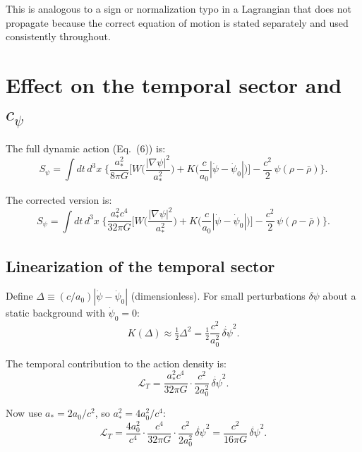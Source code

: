 \documentclass[aps,prd,twocolumn,nofootinbib]{revtex4-2}
\begin{document}
This is analogous to a sign or normalization typo in a Lagrangian that
does not propagate because the correct equation of motion is stated
separately and used consistently throughout.

\section{Effect on the temporal sector and $c_\psi$}
\label{sec:temporal}

The full dynamic action (Eq.~(6)) is:
\begin{equation}
S_\psi = \int dt\,d^3x\;\Biggl\{
  \frac{a_*^2}{8\pi G}\biggl[
    W\!\biggl(\frac{|\nabla\psi|^2}{a_*^2}\biggr)
    + K\!\biggl(\frac{c}{a_0}|\dot\psi - \dot\psi_0|\biggr)
  \biggr]
  - \frac{c^2}{2}\,\psi(\rho - \bar\rho)
\Biggr\}.
\label{eq:action-full-paper}
\end{equation}

The corrected version is:
\begin{equation}
S_\psi = \int dt\,d^3x\;\Biggl\{
  \frac{a_*^2 c^4}{32\pi G}\biggl[
    W\!\biggl(\frac{|\nabla\psi|^2}{a_*^2}\biggr)
    + K\!\biggl(\frac{c}{a_0}|\dot\psi - \dot\psi_0|\biggr)
  \biggr]
  - \frac{c^2}{2}\,\psi(\rho - \bar\rho)
\Biggr\}.
\label{eq:action-full-corrected}
\end{equation}

\subsection{Linearization of the temporal sector}

Define $\Delta \equiv (c/a_0)|\dot\psi - \dot\psi_0|$ (dimensionless).
For small perturbations $\delta\psi$ about a static background with
$\dot\psi_0 = 0$:
\begin{equation}
K(\Delta) \approx \tfrac{1}{2}\Delta^2 = \tfrac{1}{2}\frac{c^2}{a_0^2}\,\dot{\delta\psi}^2.
\end{equation}

The temporal contribution to the action density is:
\begin{equation}
\mathcal{L}_T = \frac{a_*^2 c^4}{32\pi G}\cdot\frac{c^2}{2a_0^2}\,
\dot{\delta\psi}^2.
\end{equation}

Now use $a_* = 2a_0/c^2$, so $a_*^2 = 4a_0^2/c^4$:
\begin{equation}
\mathcal{L}_T = \frac{4a_0^2}{c^4}\cdot\frac{c^4}{32\pi G}
\cdot\frac{c^2}{2a_0^2}\,\dot{\delta\psi}^2
= \frac{c^2}{16\pi G}\,\dot{\delta\psi}^2.
\end{equation}
\end{document}
